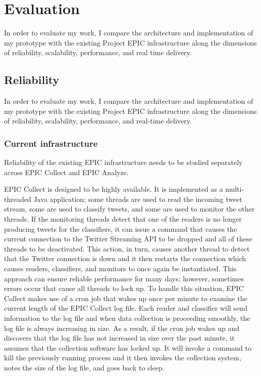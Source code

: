 
\chapter{Evaluation} %

\label{Chapter6} %

In order to evaluate my work, I compare the architecture and implementation of my prototype with the existing Project EPIC infrastructure along the dimensions of reliability, scalability, performance, and real time delivery.

\section{Reliability}

In order to evaluate my work, I compare the architecture and implementation of my prototype with the existing Project EPIC infrastructure along the dimensions of reliability, scalability, performance, and real-time delivery.

\subsection{Current infrastructure}

Reliability of the existing EPIC infrastructure needs to be studied separately across EPIC Collect and EPIC Analyze.

EPIC Collect is designed to be highly available. It is implemented as a multi-threaded Java application; some threads are used to read the incoming tweet stream, some are used to classify tweets, and some are used to monitor the other threads. If the monitoring threads detect that one of the readers is no longer producing tweets for the classifiers, it can issue a command that causes the current connection to the Twitter Streaming API to be dropped and all of these threads to be deactivated. This action, in turn, causes another thread to detect that the Twitter connection is down and it then restarts the connection which causes readers, classifiers, and monitors to once again be instantiated. This approach can ensure reliable performance for many days; however, sometimes errors occur that cause all threads to lock up. To handle this situation, EPIC Collect makes use of a cron job that wakes up once per minute to examine the current length of the EPIC Collect log file. Each reader and classifier will send information to the log file and when data collection is proceeding smoothly, the log file is always increasing in size. As a result, if the cron job wakes up and discovers that the log file has not increased in size over the past minute, it assumes that the collection software has locked up. It will invoke a command to kill the previously running process and it then invokes the collection system, notes the size of the log file, and goes back to sleep.

